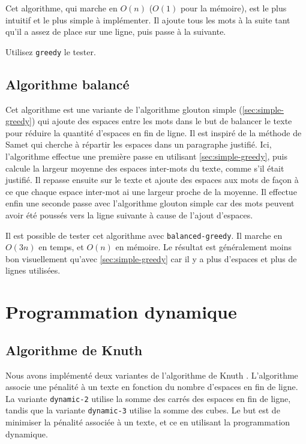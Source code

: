 \documentclass[a4paper, 11pt]{article}
\begin{document}
Cet algorithme, qui marche en $O(n)$ ($O(1)$ pour la mémoire), est le plus
intuitif et le plus simple à implémenter. Il ajoute tous les mots à la suite
tant qu'il a assez de place sur une ligne, puis passe à la suivante.

Utilisez \verb|greedy| le tester.

\subsection{Algorithme balancé}
\label{sec:balanced-greedy}

Cet algorithme est une variante de l'algorithme glouton simple
(\ref{sec:simple-greedy}) qui ajoute des espaces entre les mots dans le but de
balancer le texte pour réduire la quantité d'espaces en fin de ligne. Il est
inspiré de la méthode de Samet \cite{Samet82} qui cherche à répartir les espaces
dans un paragraphe justifié. Ici, l'algorithme effectue une première passe en
utilisant \ref{sec:simple-greedy}, puis calcule la largeur moyenne des espaces
inter-mots du texte, comme s'il était justifié. Il repasse ensuite sur le texte
et ajoute des espaces aux mots de façon à ce que chaque espace inter-mot ai une
largeur proche de la moyenne. Il effectue enfin une seconde passe avec
l'algorithme glouton simple car des mots peuvent avoir été poussés vers la ligne
suivante à cause de l'ajout d'espaces.

Il est possible de tester cet algorithme avec \verb|balanced-greedy|. Il
marche en $O(3n)$ en temps, et $O(n)$ en mémoire. Le résultat est généralement
moins bon visuellement qu'avec \ref{sec:simple-greedy} car il y a plus d'espaces
et plus de lignes utilisées.

\section{Programmation dynamique}
\label{sec:dynprog}

\subsection{Algorithme de Knuth}

Nous avons implémenté deux variantes de l'algorithme de Knuth \cite{Knuth81}.
L'algorithme associe une pénalité à un texte en fonction du nombre d'espaces en
fin de ligne. La variante \verb|dynamic-2| utilise la somme des carrés des
espaces en fin de ligne, tandis que la variante \verb|dynamic-3| utilise la
somme des cubes. Le but est de minimiser la pénalité associée à un texte, et ce
en utilisant la programmation dynamique.
\end{document}
